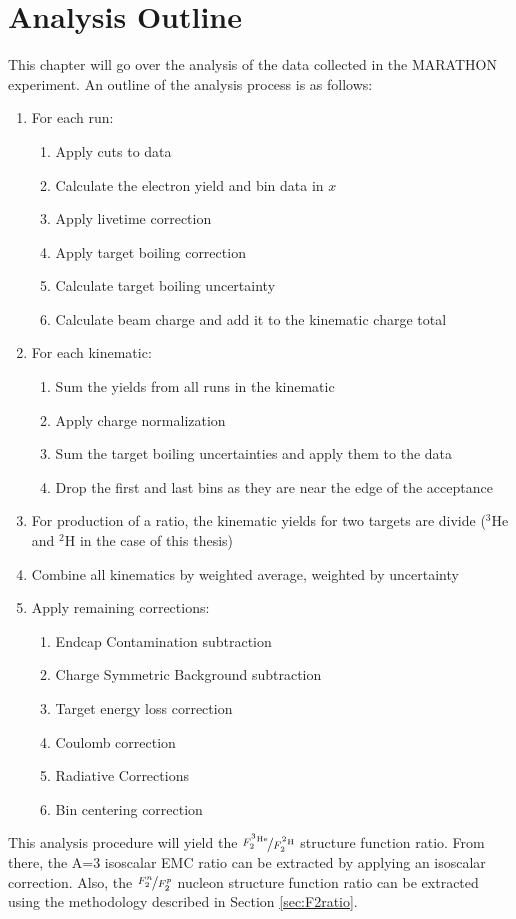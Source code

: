 \section{Analysis Outline}
\label{sec:analysis_outline}
This chapter will go over the analysis of the data collected in the MARATHON experiment. An outline of the analysis process is as follows:
\renewcommand{\labelenumii}{\roman{enumii}.}
\begin{enumerate}
	\item For each run:
	\begin{enumerate}
		\item Apply cuts to data
		\item Calculate the electron yield and bin data in $x$
		\item Apply livetime correction
		\item Apply target boiling correction
		\item Calculate target boiling uncertainty
		\item Calculate beam charge and add it to the kinematic charge total
	\end{enumerate}
	\item For each kinematic:
	\begin{enumerate}
		\item Sum the yields from all runs in the kinematic
		\item Apply charge normalization
		\item Sum the target boiling uncertainties and apply them to the data
		\item Drop the first and last bins as they are near the edge of the acceptance
	\end{enumerate}
	\item For production of a ratio, the kinematic yields for two targets are divide ($^3$He and $^2$H in the case of this thesis)
	\item Combine all kinematics by weighted average, weighted by uncertainty
	\item Apply remaining corrections:
	\begin{enumerate}
		\item Endcap Contamination subtraction
		\item Charge Symmetric Background subtraction
		\item Target energy loss correction
		\item Coulomb correction
		\item Radiative Corrections
		\item Bin centering correction
	\end{enumerate}
\end{enumerate}
This analysis procedure will yield the $\nicefrac{F_2^{^3\textrm{He}}}{F_2^{^2\textrm{H}}}$ structure function ratio. From there, the A=3 isoscalar EMC ratio can be extracted by applying an isoscalar correction. Also, the $\nicefrac{F_2^n}{F_2^p}$ nucleon structure function ratio can be extracted using the methodology described in Section \ref{sec:F2ratio}.

